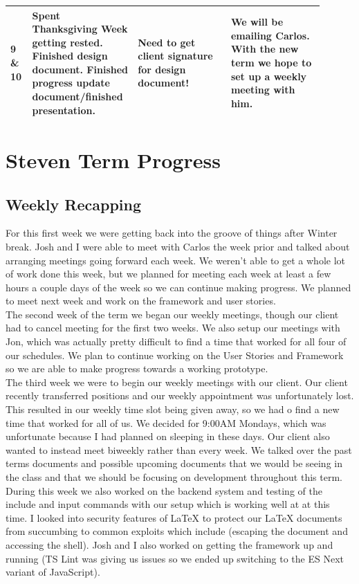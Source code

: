 \documentclass[onecolumn, draftclsnofoot,10pt, compsoc]{IEEEtran}
\begin{document}
\begin{flushleft}
\begin{tabular}{|p{0.05\linewidth}|p{0.285\linewidth}|p{0.285\linewidth}|p{0.285\linewidth}|}
	9 \hspace{3mm} \& 10
	& Spent Thanksgiving Week getting rested. Finished design document.
		Finished progress update document/finished presentation.
	& Need to get client signature for design document!
	& We will be emailing Carlos. With the new term we hope
		to set up a weekly meeting with him.  \\ \hline

\end{tabular}
\end{flushleft}

\newpage
\section{Steven Term Progress}

\subsection{Weekly Recapping}
\noindent For this first week we were getting back into the groove of things after Winter break.
Josh and I were able to meet with Carlos the week prior and talked about arranging meetings 
going forward each week. We weren't able to get a whole lot of work done this week, 
but we planned for meeting each week at least a few hours a couple days of the week so we can
continue making progress. We planned to meet next week and work on the framework and user stories. \\

\noindent The second week of the term we began our weekly meetings, though our client had to cancel
meeting for the first two weeks. We also setup our meetings with Jon, which was
actually pretty difficult to find a time that worked for all four of our schedules.
We plan to continue working on the User Stories and Framework so we are able
to make progress towards a working prototype. \\

\noindent The third week we were to begin our weekly meetings with our client.
Our client recently transferred positions and our weekly appointment was
unfortunately lost. This resulted in our weekly time slot being given away, so we had
o find a new time that worked for all of us. We decided for 9:00AM Mondays, which was 
unfortunate because I had planned on sleeping in these days. Our client also wanted to
instead meet biweekly rather than every week. We talked over the past terms documents and 
possible upcoming documents that we would be seeing in the class and that we should be 
focusing on development throughout this term. During this week we also worked on the backend 
system and testing of the include and input commands with our setup which is working well at 
at this time. I looked into security features of LaTeX to protect our LaTeX documents from 
succumbing to common exploits which include (escaping the document and accessing the shell).
Josh and I also worked on getting the framework up and running (TS Lint was giving us issues so
we ended up switching to the ES Next variant of JavaScript). \\
\end{document}
